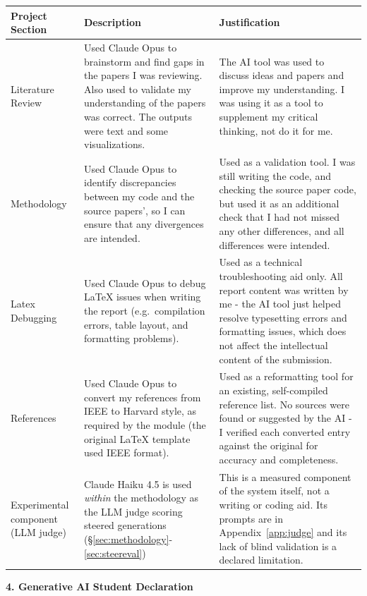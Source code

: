 \documentclass[conference]{IEEEtran}
\begin{document}
\begin{tabularx}{\textwidth}{|>{\raggedright\arraybackslash}p{2.4cm}
                             |>{\raggedright\arraybackslash}p{6cm}   %
                             |>{\raggedright\arraybackslash}X|}
\hline
\rowcolor[gray]{0.92}
Project Section & Description & Justification \\
\hline
Literature Review
& Used Claude Opus to brainstorm and find gaps in the papers I was reviewing. 
Also used to validate my understanding of the papers was correct. The outputs were text and some visualizations.
& The AI tool was used to discuss ideas and papers and improve my understanding. I was using it as a tool to supplement my critical thinking, not do it for me. 
\\
\hline
Methodology
& Used Claude Opus to identify discrepancies between my code and the source papers', so I can ensure that any divergences are intended.
& Used as a validation tool. I was still writing the code, and checking the source paper code, but used it as an additional check that I had not missed any other differences, and all differences were intended. \\
\hline
Latex Debugging
& Used Claude Opus to debug \LaTeX{} issues when writing the report
(e.g.\ compilation errors, table layout, and formatting problems).
& Used as a technical troubleshooting aid only. All report content was
written by me - the AI tool just helped resolve typesetting errors and formatting
issues, which does not affect the intellectual content of the submission. \\
\hline
References
& Used Claude Opus to convert my references from IEEE to Harvard style,
as required by the module (the original \LaTeX{} template used IEEE format).
& Used as a reformatting tool for an existing, self-compiled reference
list. No sources were found or suggested by the AI - I verified each
converted entry against the original for accuracy and completeness. \\
\hline
Experimental component (LLM judge)
& Claude Haiku 4.5 is used \emph{within} the methodology as the LLM judge
scoring steered generations (\S\ref{sec:methodology}-\ref{sec:steereval})
& This is a measured component of the system itself, not a writing or coding
aid. Its prompts are in Appendix~\ref{app:judge} and its lack of blind
validation is a declared limitation. \\
\hline
\end{tabularx}

\textbf{4. Generative AI Student Declaration}
\end{document}
